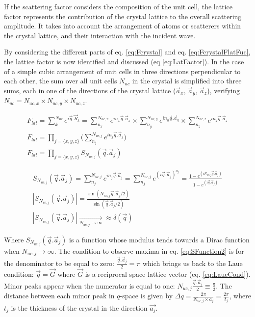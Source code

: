 If the scattering factor considers the composition of the unit cell, the lattice factor represents the contribution of the crystal lattice to the overall scattering amplitude.
It takes into account the arrangement of atoms or scatterers within the crystal lattice, and their interaction with the incident wave.

By considering the different parts of eq. \ref{eq:Fcrystal} and eq. \ref{eq:FcrystalFlatFuc}, the lattice factor is now identified and discussed (eq \ref{eq:LatFactor}).
In the case of a simple cubic arrangement of unit cells in three directions perpendicular to each other, the sum over all unit cells $N_{uc}$ in the crystal is simplified into three sums, each in one of the directions of the crystal lattice ($\vec{a}_x, \, \vec{a}_y, \, \vec{a}_z$), verifying $N_{uc} = N_{uc, x} \times N_{uc, y} \times N_{uc, z}$.

\begin{gather}
    \label{eq:LatFactor}
    F_{lat} = \sum_k^{N_{uc}} e^{i\vec{q}.\vec{R}_k} = \sum_{n_x}^{N_{uc, x}} e^{i n_x\vec{q}.\vec{a}_x} \times \sum_{n_y}^{N_{uc, y}} e^{i n_y\vec{q}.\vec{a}_y} \times \sum_{n_z}^{N_{uc, z}} e^{i n_z\vec{q}.\vec{a}_z}\\
    F_{lat} = \prod_{j=\{x,y,z\}} \Bigg( \sum_{n_j}^{N_{uc, j}} e^{i n_j\vec{q}.\vec{a}_j} \Bigg)\\
    F_{lat} = \prod_{j=\{x,y,z\}} S_{N_{uc, j}}(\vec{q}.\vec{a}_j)
\end{gather}

\begin{gather}
    \label{eq:SFunction1}
    S_{N_{uc, j}}(\vec{q}.\vec{a}_j) = \sum_{n_j}^{N_{uc, j}} e^{in_j\vec{q}.\vec{a}_j} = \sum_{n_j}^{N_{uc, j}} e^{(i\vec{q}.\vec{a}_j)^{n_j}} = \frac{1-e^{(i N_{uc, j} \vec{q}.\vec{a}_j)}}{1-e^{(i\vec{q}.\vec{a}_j)}} \\
    \label{eq:SFunction2}
    |S_{N_{uc, j}}(\vec{q}.\vec{a}_j)| = \frac{\sin(N_{uc, j} \vec{q}.\vec{a}_j/2)}{\sin(\vec{q}.\vec{a}_j/2)} \\
    \label{eq:SFunction3}
    |S_{N_{uc, j}}(\vec{q}.\vec{a}_j)| \underset{N_{uc, j} \to \infty}{\longrightarrow} \approx \delta (\vec{q})
\end{gather}

Where $S_{N_{uc, j}}(\vec{q}.\vec{a}_j)$ is a function whose modulus tends towards a Dirac function when $N_{uc, j} \longrightarrow \infty$.
The condition to observe maxima in eq. \ref{eq:SFunction2} is for the denominator to be equal to zero: $\frac{\vec{q}.\vec{a}_j}{2} = \pi$ which brings us back to the Laue condition: $\vec{q} = \vec{G}$ where $\vec{G}$ is a reciprocal space lattice vector (eq. \ref{eq:LaueCond}).
Minor peaks appear when the numerator is equal to one: $N_{uc, j}\frac{\vec{q}.\vec{a}_j}{2} \equiv \frac{\pi}{2}$.
The distance between each minor peak in $q$-space is given by $\Delta q = \frac{2\pi}{N_{uc, j} \times a_j} = \frac{2\pi}{t_j}$, where $t_j$ is the thickness of the crystal in the direction $\vec{a_j}$.

